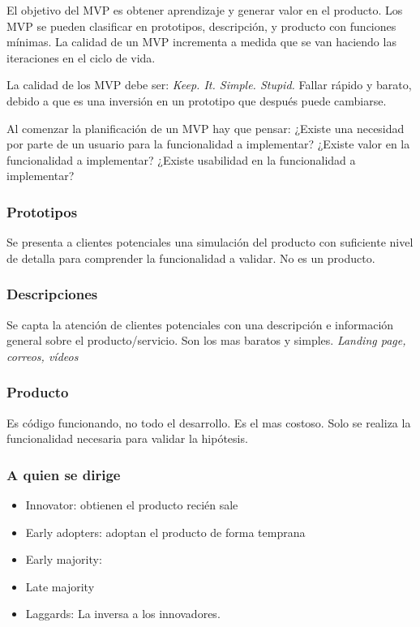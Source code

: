 \documentclass[titlepage,a4paper]{article}
\begin{document}
El objetivo del MVP es obtener aprendizaje y generar valor en el producto. Los MVP se pueden clasificar en prototipos, descripción, y producto con funciones mínimas. La calidad de un MVP incrementa a medida que se van haciendo las iteraciones en el ciclo de vida.

La calidad de los MVP debe ser: \textit{Keep. It. Simple. Stupid.} Fallar rápido y barato, debido a que es una inversión en un prototipo que después puede cambiarse.


Al comenzar la planificación de un MVP hay que pensar:
¿Existe una necesidad por parte de un usuario para la funcionalidad a implementar?
¿Existe valor en la funcionalidad a implementar?
¿Existe usabilidad en la funcionalidad a implementar?


\subsubsection*{Prototipos}
Se presenta a clientes potenciales una simulación del producto con suficiente nivel de detalla para comprender la funcionalidad a validar. 
No es un producto.

\subsubsection*{Descripciones}
Se capta la atención de clientes potenciales con una descripción e información general sobre el producto/servicio. Son los mas baratos y simples. \textit{Landing page, correos, vídeos}

\subsubsection*{Producto}
Es código funcionando, no todo el desarrollo. Es el mas costoso. Solo se realiza la funcionalidad necesaria para validar la hipótesis.

\subsubsection*{A quien se dirige}

\begin{itemize}
    \item Innovator: obtienen el producto recién sale
    \item Early adopters: adoptan el producto de forma temprana
    \item Early majority: 
    \item Late majority
    \item Laggards: La inversa a los innovadores.
\end{itemize}
\end{document}
